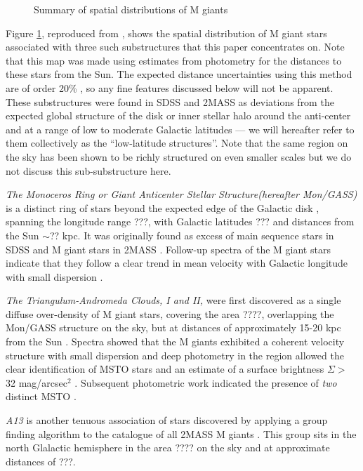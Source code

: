 \documentclass[galaxies,article,submit,moreauthors,pdftex,10pt,a4paper]{mdpi}
\begin{document}
\begin{figure}[t]
\label{fig:ting}
\centering
\caption{\label{fig:ting}
Summary of spatial distributions of M giants}
\end{figure}

Figure \ref{fig:ting}, reproduced from \cite{li17}, shows the spatial distribution of M giant stars associated with three such substructures that this paper concentrates on. Note that this map was made using estimates from photometry  for the distances to these stars from the Sun.
The expected distance uncertainties using this method are of order 20\% \citep{sheffield14}, so any fine features discussed below will not be apparent.
These substructures were found in SDSS and 2MASS as deviations from the expected global structure of the disk or inner stellar halo around the anti-center and at a range of low to moderate Galactic latitudes --- we will hereafter refer to them collectively as the ``low-latitude structures''.
Note that the same region on the sky has been shown to be richly structured on even smaller  scales\citep{slater14,martin14,deason14} but we do not discuss this sub-substructure here.
\begin{description}
\item{\it The Monoceros Ring or Giant Anticenter Stellar Structure(hereafter Mon/GASS)} is a distinct ring of stars beyond the expected edge of the Galactic disk \citep[at $\sim$ 5 kpc beyound the Sun][]{robin92},  spanning the longitude range ???, with Galactic latitudes ??? and distances from the Sun $\sim$?? kpc. It was originally found as excess of main sequence stars in SDSS \citep{yanny03,ibata03} and M giant stars in 2MASS \citep{rochapinto03}. Follow-up spectra of the M giant stars indicate that they follow a clear trend in mean velocity with Galactic longitude with small dispersion \citep{crane04}.
\item{\it The Triangulum-Andromeda Clouds, I and II,} were first discovered as a single diffuse over-density of M giant stars, covering the area ????, overlapping the Mon/GASS structure on the sky, but at distances of approximately 15-20 kpc from the Sun \citep{rochapinto04}.
Spectra showed that the M giants exhibited a coherent velocity structure with small dispersion  \citep{rochapinto04} and  deep photometry in the region allowed the clear identification of MSTO stars and an estimate of a surface brightness $\Sigma >$ 32 mag/arcsec$^2$ \cite{majewski04}.
Subsequent photometric work indicated the presence of {\it two} distinct MSTO \citep{martic07}.
\item{\it A13} is another tenuous association of stars discovered by applying a group finding algorithm \citep{sharma09} to the catalogue of all 2MASS M giants \citep{sharma10}.
This group sits in the north Glalactic hemisphere in the area ???? on the sky and at approximate distances of ???.
\end{description}
\end{document}

